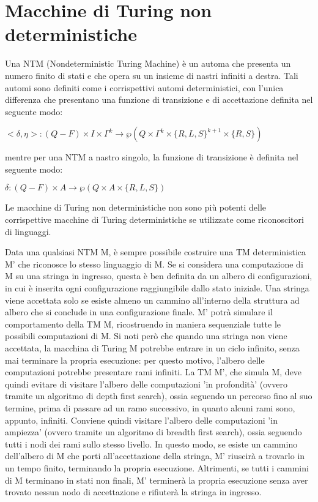   \section{Macchine di Turing non deterministiche}
  Una NTM (Nondeterministic Turing Machine) è un automa che presenta un numero finito di stati e che opera su un insieme di nastri infiniti a destra. Tali automi sono definiti come i corrispettivi automi deterministici, con l'unica differenza che presentano una funzione di transizione e di accettazione definita nel seguente modo:

  \(<\delta, \eta>:(Q-F)\times I\times \Gamma^k\to\wp(Q\times\Gamma^k\times\{R,L,S\}^{k+1}\times\{R,S\})\)
  
  \noindent
  mentre per una NTM a nastro singolo, la funzione di transizione è definita nel seguente modo:

  \(\delta:(Q-F)\times A\to\wp(Q\times A\times\{R,L,S\})\)

  \begin{theorem}
    Le macchine di Turing non deterministiche non sono più potenti delle corrispettive macchine di Turing deterministiche se utilizzate come riconoscitori di linguaggi.
  \end{theorem} 

  Data una qualsiasi NTM M, è sempre possibile costruire una TM deterministica M' che riconosce lo stesso linguaggio di M. Se si considera una computazione di M su una stringa in ingresso, questa è ben definita da un albero di configurazioni, in cui è inserita ogni configurazione raggiungibile dallo stato iniziale. Una stringa viene accettata solo se esiste almeno un cammino all'interno della struttura ad albero che si conclude in una configurazione finale. M' potrà simulare il comportamento della TM M, ricostruendo in maniera sequenziale tutte le possibili computazioni di M. Si noti però che quando una stringa non viene accettata, la macchina di Turing M potrebbe entrare in un ciclo infinito, senza mai terminare la propria esecuzione: per questo motivo, l'albero delle computazioni potrebbe presentare rami infiniti. La TM M', che simula M, deve quindi evitare di visitare l'albero delle computazioni 'in profondità' (ovvero tramite un algoritmo di depth first search), ossia seguendo un percorso fino al suo termine, prima di passare ad un ramo successivo, in quanto alcuni rami sono, appunto, infiniti. Conviene quindi visitare l'albero delle computazioni 'in ampiezza' (ovvero tramite un algoritmo di breadth first search), ossia seguendo tutti i nodi dei rami sullo stesso livello. In questo modo, se esiste un cammino dell'albero di M che porti all'accettazione della stringa, M' riuscirà a trovarlo in un tempo finito, terminando la propria esecuzione. Altrimenti, se tutti i cammini di M terminano in stati non finali, M' terminerà la propria esecuzione senza aver trovato nessun nodo di accettazione e rifiuterà la stringa in ingresso. 